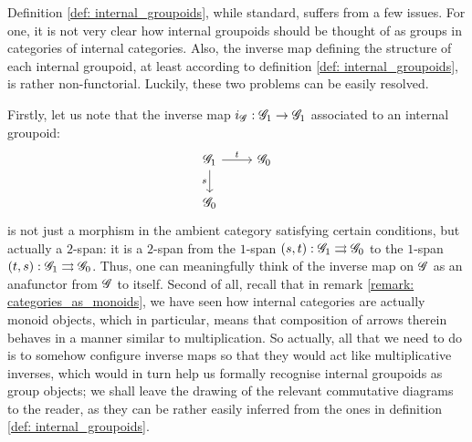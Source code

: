                     \begin{remark}
                        Definition \ref{def: internal_groupoids}, while standard, suffers from a few issues. For one, it is not very clear how internal groupoids should be thought of as groups in categories of internal categories. Also, the inverse map defining the structure of each internal groupoid, at least according to definition \ref{def: internal_groupoids}, is rather non-functorial. Luckily, these two problems can be easily resolved. 
                        
                        Firstly, let us note that the inverse map $i_{\mathscr{G}}: \mathscr{G}_1 \to \mathscr{G}_1$ associated to an internal groupoid:
                            $$
                                \begin{tikzcd}
                                	{\scrG_1} & {\scrG_0} \\
                                	{\scrG_0}
                                	\arrow["s"', from=1-1, to=2-1]
                                	\arrow["t", from=1-1, to=1-2]
                                \end{tikzcd}
                            $$
                        is not just a morphism in the ambient category satisfying certain conditions, but actually a $2$-span: it is a $2$-span from the $1$-span $(s,t): \mathscr{G}_1 \rightrightarrows \mathscr{G}_0$ to the $1$-span $(t,s): \mathscr{G}_1 \rightrightarrows \mathscr{G}_0$. Thus, one can meaningfully think of the inverse map on $\mathscr{G}$ as an anafunctor from $\mathscr{G}$ to itself. Second of all, recall that in remark \ref{remark: categories_as_monoids}, we have seen how internal categories are actually monoid objects, which in particular, means that composition of arrows therein behaves in a manner similar to multiplication. So actually, all that we need to do is to somehow configure inverse maps so that they would act like multiplicative inverses, which would in turn help us formally recognise internal groupoids as group objects; we shall leave the drawing of the relevant commutative diagrams to the reader, as they can be rather easily inferred from the ones in definition \ref{def: internal_groupoids}. 
                    \end{remark}
                

